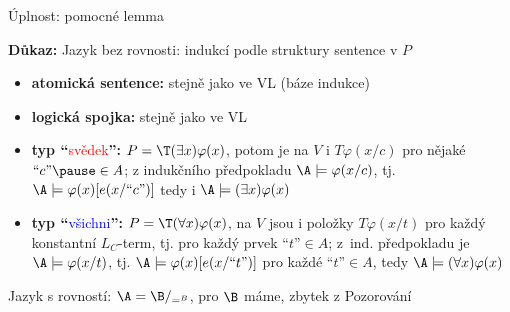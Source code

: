 \documentclass{beamer}
\begin{document}
\begin{frame}{Úplnost: pomocné lemma}

    \pause

    \pause
    \textbf{Důkaz:} \pause
    \alert{Jazyk bez rovnosti:} indukcí podle struktury sentence v $P$\pause

    \begin{itemize}
        \item \textbf{atomická sentence:} stejně jako ve VL (\alert{báze indukce})\pause
        
        \medskip

        \item \textbf{logická spojka:} stejně jako ve VL\pause
        
        \medskip

        \item \textbf{typ ``}\textcolor{red}{svědek}\textbf{'':} \pause \alert{$P=\T(\exists x)\varphi(x)$}, potom je na $V$ i $T\varphi(x/c)$ pro nějaké $\text{``$c$''}\pause\in A$; z indukčního předpokladu $\A\models\varphi(x/c)$, tj. $\A\models\varphi(x)[e(x/\text{``$c$''})]$ tedy i $\A\models(\exists x)\varphi(x)$\pause

        \medskip

        \item \textbf{typ ``}\textcolor{blue}{všichni}\textbf{'':} \pause \alert{$P=\T(\forall x)\varphi(x)$}, na $V$ jsou i položky $T\varphi(x/t)$ pro každý konstantní $L_C$-term, tj. pro každý prvek $\text{``$t$''}\in A$; \pause z~ind. předpokladu je $\A\models\varphi(x/t)$, tj. $\A\models\varphi(x)[e(x/\text{``$t$''})]$ pro každé $\text{``$t$''}\in A$, tedy $\A\models(\forall x)\varphi(x)$
        
    \end{itemize}

    \pause
    \alert{Jazyk s rovností:} $\A=\B/_{=^B}$, pro $\B$ máme, zbytek z Pozorování \hfill\qedsymbol

\end{frame}
\end{document}
